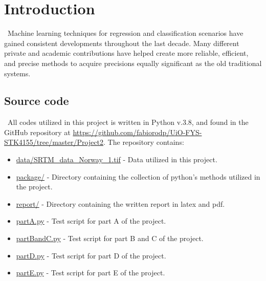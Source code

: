 \section{Introduction}
\label{chap:Introduction}

\quad \, Machine learning techniques for regression and classification scenarios have gained consistent developments throughout the last decade. Many different private and academic contributions have helped create more reliable, efficient, and precise methods to acquire precisions equally significant as the old traditional systems.

\subsection{Source code}
\label{chap:Source code}

\quad \, All codes utilized in this project is written in Python v.3.8, and found in the GitHub repository at \href{https://github.com/fabiorodp/UiO-FYS-STK4155/tree/master/Project2}{https://github.com/fabiorodp/UiO-FYS-STK4155/tree/master/Project2}. The repository contains:

\begin{itemize}
\item \href{https://github.com/fabiorodp/UiO-FYS-STK4155/tree/master/Project2/data/SRTM_data_Norway_1.tif}{data/SRTM\_data\_Norway\_1.tif} - Data utilized in this project.
\item \href{https://github.com/fabiorodp/UiO-FYS-STK4155/tree/master/Project2/package/}{package/} - Directory containing the collection of python's methods utilized in the project.
\item \href{https://github.com/fabiorodp/UiO-FYS-STK4155/tree/master/Project2/report/}{report/} - Directory containing the written report in latex and pdf.
\item \href{https://github.com/fabiorodp/UiO-FYS-STK4155/tree/master/Project2/partA.py}{partA.py} - Test script for part A of the project.
\item \href{https://github.com/fabiorodp/UiO-FYS-STK4155/tree/master/Project2/partBandC.py}{partBandC.py} - Test script for part B and C of the project.
\item \href{https://github.com/fabiorodp/UiO-FYS-STK4155/tree/master/Project2/partD.py}{partD.py} - Test script for part D of the project.
\item \href{https://github.com/fabiorodp/UiO-FYS-STK4155/tree/master/Project2/partE.py}{partE.py} - Test script for part E of the project.
\end{itemize}
